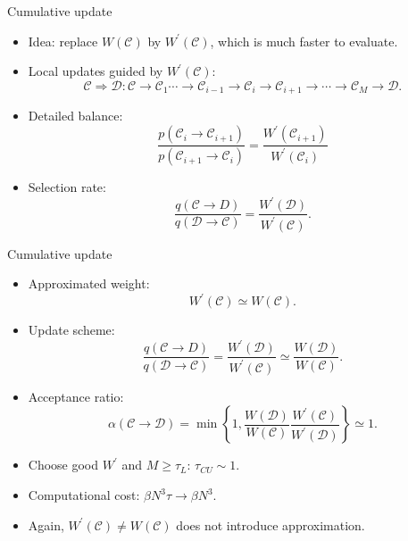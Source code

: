 \documentclass[xcolor=table, 10pt, aspectratio=43]{beamer}
\begin{document}
\begin{frame}{Cumulative update}
  \begin{itemize}
    \item Idea: replace $W(\mathcal C)$ by $W^\prime(\mathcal C)$, which is much faster to evaluate.
    \item Local updates guided by $W^\prime(\mathcal C)$:
    \[\mathcal C\Rightarrow\mathcal D:
    \mathcal C\rightarrow\mathcal C_1\cdots\rightarrow\mathcal C_{i-1}\rightarrow\mathcal C_i\rightarrow\mathcal C_{i+1}\rightarrow\cdots\rightarrow\mathcal C_M\rightarrow\mathcal D.\]
    \item Detailed balance:
    \[\frac{p(\mathcal C_i\rightarrow\mathcal C_{i+1})}{p(\mathcal C_{i+1}\rightarrow\mathcal C_i)}=\frac{W^\prime(\mathcal C_{i+1})}{W^\prime(\mathcal C_i)}\]
    \item Selection rate:
    \[\frac{q(\mathcal C\rightarrow D)}
    {q(\mathcal D\rightarrow\mathcal C)}
    =\frac{W^\prime(\mathcal D)}{W^\prime(\mathcal C)}.\]
  \end{itemize}
\end{frame}

\begin{frame}{Cumulative update}
  \begin{itemize}
    \item Approximated weight:
    \[W^\prime(\mathcal C)\simeq W(\mathcal C).\]
    \item Update scheme:
    \[\frac{q(\mathcal C\rightarrow D)}
    {q(\mathcal D\rightarrow\mathcal C)}
    =\frac{W^\prime(\mathcal D)}{W^\prime(\mathcal C)}
    \simeq\frac{W(\mathcal D)}{W(\mathcal C)}.\]
    \item Acceptance ratio:
    \[\alpha(\mathcal C\rightarrow \mathcal D)=\min\left\{1, \frac{W(\mathcal D)}{W(\mathcal C)}
    \frac{W^\prime(\mathcal C)}{W^\prime(\mathcal D)}\right\}\simeq1.\]
    \item Choose good $W^\prime$ and $M\geq\tau_L$: $\tau_{CU}\sim1$.
    \item Computational cost: $\beta N^3\tau\rightarrow \beta N^3$.
    \item Again, $W^\prime(\mathcal C)\neq W(\mathcal C)$ does not introduce approximation.
  \end{itemize}
\end{frame}
\end{document}
